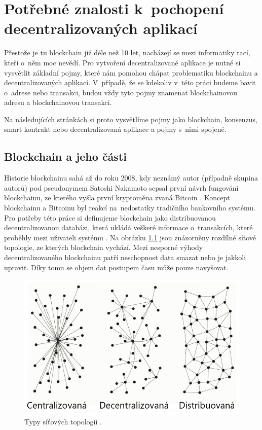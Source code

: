 \chapter{Potřebné znalosti k~pochopení decentralizovaných aplikací}
\label{chapter:2}
Přestože je tu blockchain již déle než 10 let, nacházejí se mezi informatiky tací, kteří o~něm moc nevědí. Pro vytvoření decentralizované aplikace je nutné si vysvětlit základní pojmy, které nám pomohou chápat problematiku blockchainu a decentralizovaných aplikací. V~případě, že se kdekoliv v~této práci budeme bavit o~adrese nebo transakci, budou vždy tyto pojmy znamenat blockchainovou adresu a blockchainovou transakci.

Na následujících stránkách si proto vysvětlíme pojmy jako blockchain, konsenzus, smart kontrakt nebo decentralizovaná aplikace a pojmy s~nimi spojené.

\section{Blockchain a jeho části}
Historie blockchainu sahá až do roku 2008, kdy neznámý autor (případně skupina autorů) pod pseudonymem Satoshi Nakamoto sepsal první návrh fungování blockchainu, ze kterého vyšla první kryptoměna zvaná Bitcoin \cite{Nakamoto2008}. Koncept blockchainu a Bitcoinu byl reakcí na~nedostatky tradičního bankovního systému. Pro potřeby této práce si definujeme blockchain jako distribuovanou decentralizovanou databázi, která ukládá veškeré informace o~transakcích, které proběhly mezi uživateli systému \cite{Bashir2017}. Na obrázku \ref{fig:topologie} jsou znázorněny rozdílné síťové topologie, ze kterých blockchain vychází. Mezi nesporné výhody decentralizovaného blockchainu patří neschopnost data smazat nebo je jakkoli upravit. Díky tomu se objem dat postupem času může pouze navyšovat.

\begin{figure}
\centering
\includegraphics[width=\textwidth]{obrazky/centralized-vs-decentralized-vs-distributed-processing.png}
\caption{Typy síťových topologií \cite{Topologie}.} 
\label{fig:topologie}
\centering
\end{figure}

